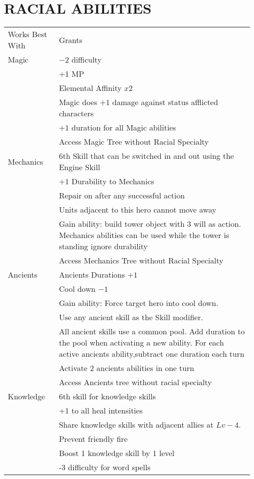 \section{RACIAL ABILITIES}
\begin{tabularx}{\textwidth}{l X}
\hline
Works Best With & Grants \\
Magic & $-2$ difficulty \\
  & +1 MP\\
  & Elemental Affinity $x2$\\
  & Magic does $+1$ damage against status afflicted characters \\
  & $+ 1$ duration for all Magic abilities \\
  & Access Magic Tree without Racial Specialty \\
Mechanics & 6th Skill that can be switched in and out using the Engine Skill \\
  & $+1$ Durability to Mechanics\\
  & Repair on after any successful action\\
  & Units adjacent to this hero cannot move away\\
  & Gain ability: build tower object with 3 will as action.  Mechanics abilities can be used while the tower is standing ignore durability\\
  & Access Mechanics Tree without Racial Specialty\\
Ancients & Ancients Durations $+1$\\
  & Cool down $-1$\\
  & Gain ability: Force target hero into cool down. \\
  & Use any ancient skill as the Skill modifier. \\
  & All ancient skills use a common pool.  Add duration to the pool when activating a new ability.  For each active ancients ability,subtract one duration each turn \\
  & Activate 2 ancients abilities in one turn \\
  & Access Ancients tree without racial specialty \\
Knowledge & 6th skill for knowledge skills \\
  & +1 to all heal intensities \\
  & Share knowledge skills with adjacent allies at $Lv-4$. \\
  & Prevent friendly fire\\
  & Boost 1 knowledge skill by 1 level\\
  & -3 difficulty for word spells \\
\end{tabularx}
